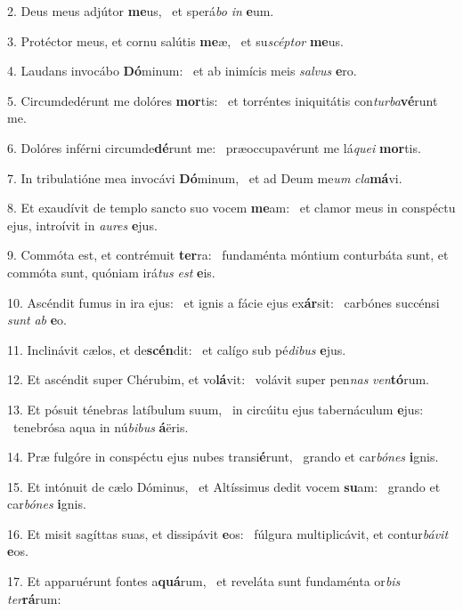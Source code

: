 2. Deus meus adjútor \textbf{me}us, \ast\  et sperá\textit{bo} \textit{in} \textbf{e}um.\

3. Protéctor meus, et cornu salútis \textbf{me}æ, \ast\  et su\textit{scép}\textit{tor} \textbf{me}us.\

4. Laudans invocábo \textbf{Dó}minum: \ast\  et ab inimícis meis \textit{sal}\textit{vus} \textbf{e}ro.\

5. Circumdedérunt me dolóres \textbf{mor}tis: \ast\  et torréntes iniquitátis con\textit{tur}\textit{ba}\textbf{vé}runt me.\

6. Dolóres inférni circumde\textbf{dé}runt me: \ast\  præoccupavérunt me lá\textit{que}\textit{i} \textbf{mor}tis.\

7. In tribulatióne mea invocávi \textbf{Dó}minum, \ast\  et ad Deum me\textit{um} \textit{cla}\textbf{má}vi.\

8. Et exaudívit de templo sancto suo vocem \textbf{me}am: \ast\  et clamor meus in conspéctu ejus, introívit in \textit{au}\textit{res} \textbf{e}jus.\

9. Commóta est, et contrémuit \textbf{ter}ra: \ast\  fundaménta móntium conturbáta sunt, et commóta sunt, quóniam irá\textit{tus} \textit{est} \textbf{e}is.\

10. Ascéndit fumus in ira ejus: \dag\  et ignis a fácie ejus ex\textbf{ár}sit: \ast\  carbónes succénsi \textit{sunt} \textit{ab} \textbf{e}o.\

11. Inclinávit cælos, et de\textbf{scén}dit: \ast\  et calígo sub pé\textit{di}\textit{bus} \textbf{e}jus.\

12. Et ascéndit super Chérubim, et vo\textbf{lá}vit: \ast\  volávit super pen\textit{nas} \textit{ven}\textbf{tó}rum.\

13. Et pósuit ténebras latíbulum suum, \dag\  in circúitu ejus tabernáculum \textbf{e}jus: \ast\  tenebrósa aqua in nú\textit{bi}\textit{bus} \textbf{á}ëris.\

14. Præ fulgóre in conspéctu ejus nubes transi\textbf{é}runt, \ast\  grando et car\textit{bó}\textit{nes} \textbf{i}gnis.\

15. Et intónuit de cælo Dóminus, \dag\  et Altíssimus dedit vocem \textbf{su}am: \ast\  grando et car\textit{bó}\textit{nes} \textbf{i}gnis.\

16. Et misit sagíttas suas, et dissipávit \textbf{e}os: \ast\  fúlgura multiplicávit, et contur\textit{bá}\textit{vit} \textbf{e}os.\

17. Et apparuérunt fontes a\textbf{quá}rum, \ast\  et reveláta sunt fundaménta or\textit{bis} \textit{ter}\textbf{rá}rum:\

